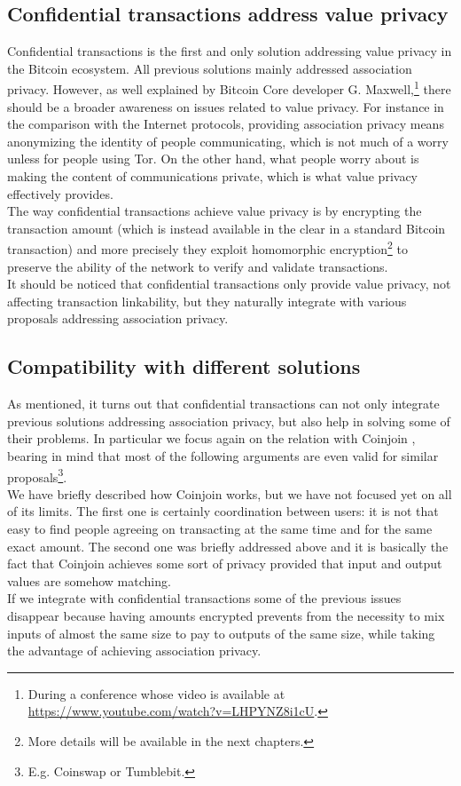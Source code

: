 \subsection{Confidential transactions address value privacy}
\label{sec::CT_value_priv}
Confidential transactions is the first and only solution addressing value privacy in the Bitcoin ecosystem. All previous solutions mainly addressed association privacy. However, as well explained by Bitcoin Core developer G. Maxwell,\footnote{During a conference whose video is available at \url{https://www.youtube.com/watch?v=LHPYNZ8i1cU}.} there should be a broader awareness on issues related to value privacy. For instance in the comparison with the Internet protocols, providing association privacy means anonymizing the identity of people communicating, which is not much of a worry unless for people using Tor. On the other hand, what people worry about is making the content of communications private, which is what value privacy effectively provides.\\
The way confidential transactions achieve value privacy is by encrypting the transaction amount (which is instead available in the clear in a standard Bitcoin transaction) and more precisely they exploit homomorphic encryption\footnote{More details will be available in the next chapters.} to preserve the ability of the network to verify and validate transactions.\\
It should be noticed that confidential transactions only provide value privacy, not affecting transaction linkability, but they naturally integrate with various proposals addressing association privacy.

\subsection{Compatibility with different solutions}
\label{sec::compatibility}
As mentioned, it turns out that confidential transactions can not only integrate previous solutions addressing association privacy, but also help in solving some of their problems. In particular 
we focus again on the relation with Coinjoin \cite{Max13}, bearing in mind that most of the following arguments are even valid for similar proposals\footnote{E.g. Coinswap or Tumblebit.}.\\
We have briefly described how Coinjoin works, but we have not focused yet on all of its limits. The first one is certainly coordination between users: it is not that easy to find people agreeing on transacting at the same time and for the same exact amount. The second one was briefly addressed above and it is basically the fact that Coinjoin achieves some sort of privacy provided that input and output values are somehow matching.\\
If we integrate with confidential transactions some of the previous issues disappear because having amounts encrypted prevents from the necessity to mix inputs of almost the same size to pay to outputs of the same size, while taking the advantage of achieving association privacy.

